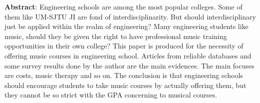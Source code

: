 \textbf{Abstract}: Engineering schools are among the most popular colleges. Some of them like UM-SJTU JI are fond of interdisciplinarity. But should interdisciplinary just be applied within the realm of engineering? Many engineering students like music, should they be given the right to have professional music training opportunities in their own college? This paper is produced for the necessity of offering music courses in engineering school. Articles from reliable databases and some survey results done by the author are the main evidences. The main focuses are costs, music therapy and so on. The conclusion is that engineering schools should encourage students to take music courses by actually offering them, but they cannot be so strict with the GPA concerning to musical courses.
